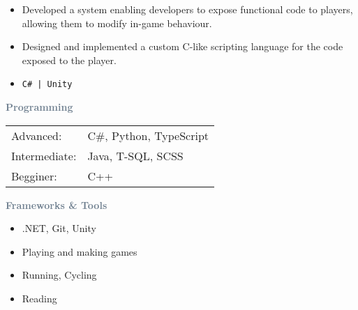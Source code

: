 \documentclass[10pt,a4paper,withhyper]{altacv}
\begin{document}
\begin{paracol}{2}
\divider

\begin{itemize}
\item Developed a system enabling developers to expose functional code to players, allowing them to modify in-game behaviour.
\item Designed and implemented a custom C-like scripting language for the code exposed to the player.
\item[] \color{black}\texttt{C\# | Unity}
\end{itemize}

\switchcolumn


\textcolor{SlateGrey}{\textbf{Programming}}
\smallskip
  \begin{tabular}{ll}
      Advanced: &C\#, Python, TypeScript \\
      Intermediate: &Java, T-SQL, SCSS \\
      Begginer: &C++ \\
  \end{tabular}

\divider

\textcolor{SlateGrey}{\textbf{Frameworks \& Tools}}
\smallskip
\begin{itemize}
    \item[] .NET, Git, Unity
\end{itemize}


\divider


\medskip



\divider


\divider


\divider


\medskip

\begin{itemize}
\item Playing and making games
\item Running, Cycling
\item Reading
\end{itemize}

\end{paracol}
\end{document}
